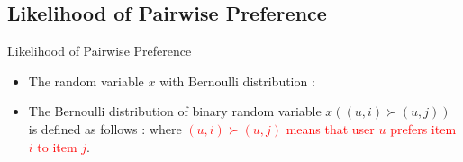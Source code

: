 \subsection*{Likelihood of Pairwise Preference}
\begin{frame}{Likelihood of Pairwise Preference}
	\begin{itemize}
		
		\setlength{\itemsep}{2ex plus0.2ex}
		
		\item The random variable $x$ with Bernoulli distribution :
		
		
		
		\item The Bernoulli distribution of binary random variable $x \left(\left(u,i\right) \succ \left(u,j\right)\right)$ is
		defined as follows :
		where \textcolor{red}{$(u,i) \succ (u,j)$ means that user $u$ prefers item $i$ to item $j$}.
	\end{itemize}
\end{frame}




